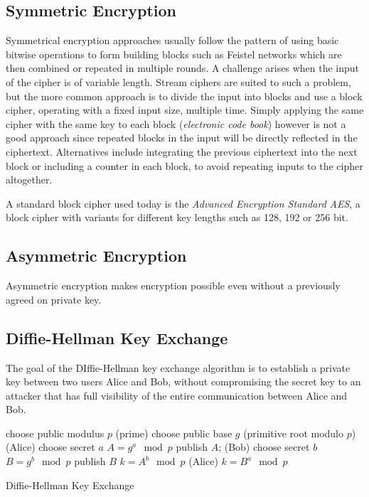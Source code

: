 \subsection{Symmetric Encryption}
Symmetrical encryption approaches usually follow the pattern of using basic
bitwise operations to form building blocks such as Feistel networks which are
then combined or repeated in multiple rounds. A challenge arises when the input
of the cipher is of variable length. Stream ciphers are suited to such a
problem, but the more common approach is to divide the input into blocks and use
a block cipher, operating with a fixed input size, multiple time. Simply
applying the same cipher with the same key to each block (\textit{electronic
code book}) however is not a good approach since repeated blocks in the input
will be directly reflected in the ciphertext. Alternatives include integrating
the previous ciphertext into the next block or including a counter in each
block, to avoid repeating inputs to the cipher altogether.

A standard block cipher used today is the \textit{Advanced Encryption Standard}
\emph{AES}, a block cipher with variants for different key lengths such as 128,
192 or 256 bit.

\subsection{Asymmetric Encryption}

Asymmetric encryption makes encryption possible even without a previously agreed
on private key.

\subsection{Diffie-Hellman Key Exchange}
The goal of the DIffie-Hellman key exchange algorithm is to establish a private
key between two users Alice and Bob, without compromising the secret key to an
attacker that has full visibility of the entire communication between Alice and
Bob.

\begin{algorithm}
    \SetAlgoLined
    
    choose public modulus $p$ (prime)\;
    choose public base $g$ (primitive root modulo $p$)\;
    \Begin(Alice){
        choose secret $a$\;
        $A = g^a \mod p$\;
        publish $A$;
    }
    \Begin(Bob){
        choose secret $b$\;
        $B = g^b \mod p$\;
        publish $B$\;
        $k = A^b \mod p$\;
    }
    \Begin(Alice){
        $k = B^a  \mod p$\;
    }
    \caption{Diffie-Hellman Key Exchange}
\end{algorithm}

